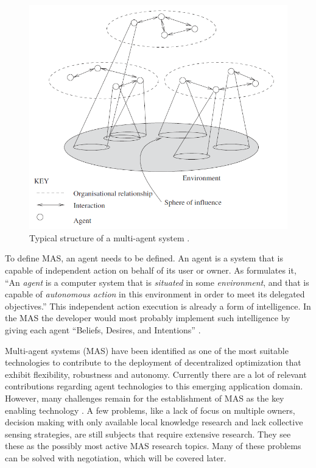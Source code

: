 \begin{figure}[h]
	\centering
	\includegraphics[width=0.7\linewidth]{./img/MAS_example}
	\caption{Typical structure of a multi-agent system \citep{wooldridge2009introduction}.}
	\label{fig:MAS_example}
\end{figure}

To define MAS, an agent needs to be defined. An agent is a system that is capable of independent action on behalf of its user or owner. As  \citet{wooldridge2009introduction} formulates it, ``An \textit{agent} is a computer system that is \textit{situated} in some \textit{environment}, and that is capable of \textit{autonomous action} in this environment in order to meet its delegated objectives.'' This independent action execution is already a form of intelligence\citep{wooldridge2009introduction}. In the MAS the developer would most probably implement such intelligence by giving each agent ``Beliefs, Desires, and Intentions'' \citep{rao1995bdi}.  

Multi-agent systems (MAS) have been identified as one of the most suitable technologies to contribute to the deployment of decentralized optimization that exhibit flexibility, robustness and autonomy\citep{vinyals2010survey}. Currently there are a lot of relevant contributions regarding agent technologies to this emerging application domain. However, many challenges remain for the establishment of MAS as the key enabling technology \citep{vinyals2010survey}. A few problems, like a lack of focus on multiple owners, decision making with only available local knowledge research and lack collective sensing strategies, are still subjects that require extensive research. They see these as the possibly most active MAS research topics. Many of these problems can be solved with negotiation, which will be covered later.

